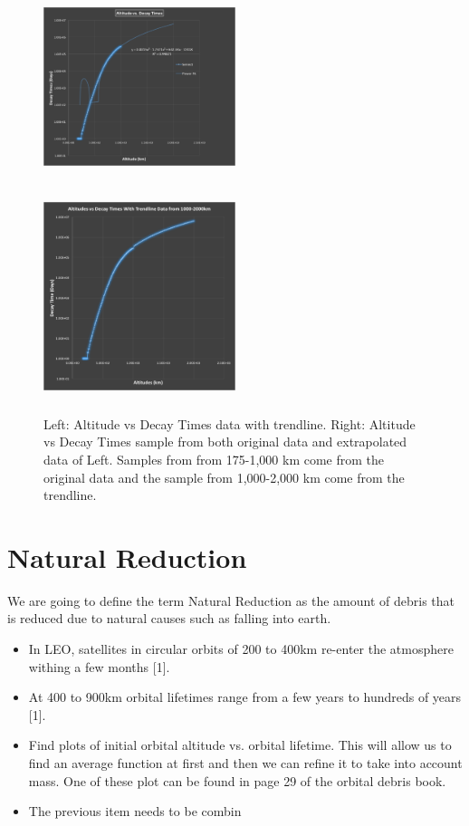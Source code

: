 \documentclass{article}
\theoremstyle{definition}
\begin{document}
\begin{enumerat}
\begin{figure}[h]
\centerline{%
\includegraphics[height=6cm, width=0.5\textwidth]{"../Figures/extrapolatedAltDecayTimes"}%
\includegraphics[height=6cm, width=0.5\textwidth]{"../Figures/altDecayTimesWithAddedData"}%
}%
\caption{Left: Altitude vs Decay Times data with trendline. Right: Altitude vs Decay Times sample from both original data and extrapolated data of Left. Samples from from 175-1,000 km come from the original data and the sample from 1,000-2,000 km come from the trendline.}
\label{fig:altDecayTimesExtrapolated}
\end{figure}


\section*{Natural Reduction}
We are going to define the term Natural Reduction as the amount of debris that is reduced due to natural causes such as falling into earth.

\begin{itemize}
  \item In LEO, satellites in circular orbits of 200 to 400km re-enter the atmosphere withing a few months [1].
  \item At 400 to 900km orbital lifetimes range from a few years to hundreds of years [1].
  \item Find plots of initial orbital altitude vs. orbital lifetime. This will allow us to find an average function at first and then we can refine it to take into account mass. One of these plot can be found in page 29 of the orbital debris book.
  \item The previous item needs to be combin 
\end{itemize}


\end{enumerat}
\end{document}
